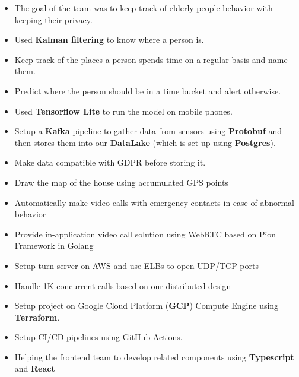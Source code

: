 \begin{itemize}
      \item The goal of the team was to keep track of elderly people behavior with keeping their privacy.
      \item Used \textbf{Kalman filtering} to know where a person is.
      \item Keep track of the places a person spends time on a regular basis and name them.
      \item Predict where the person should be in a time bucket and alert otherwise.
      \item Used \textbf{Tensorflow Lite} to run the model on mobile phones.
      \item Setup a \textbf{Kafka} pipeline to gather data from sensors using \textbf{Protobuf} and then stores them into our \textbf{DataLake} (which is set up using \textbf{Postgres}).
      \item Make data compatible with GDPR before storing it.
      \item Draw the map of the house using accumulated GPS points
      \item Automatically make video calls with emergency contacts in case of abnormal behavior
      \item Provide in-application video call solution using WebRTC based on Pion Framework in Golang
      \item Setup turn server on AWS and use ELBs to open UDP/TCP ports
      \item Handle 1K concurrent calls based on our distributed design
      \item Setup project on Google Cloud Platform (\textbf{GCP}) Compute Engine using \textbf{Terraform}.
      \item Setup CI/CD pipelines using GitHub Actions.
      \item Helping the frontend team to develop related components using \textbf{Typescript} and \textbf{React}
\end{itemize}
